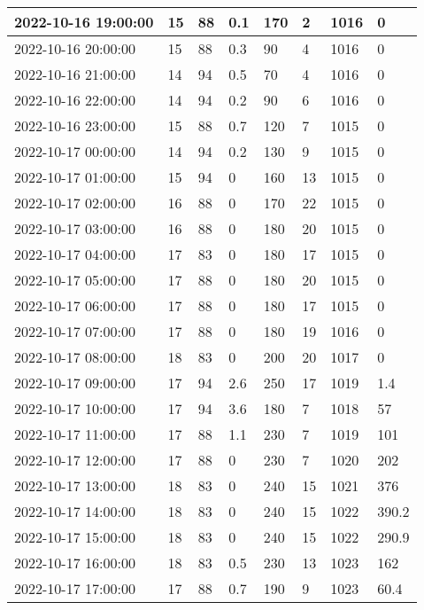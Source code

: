 \begin{longtable}{|l|l|l|l|l|l|l|l|}
        2022-10-16 19:00:00 & 15 & 88 & 0.1 & 170 & 2 & 1016 & 0 \\ \hline
        2022-10-16 20:00:00 & 15 & 88 & 0.3 & 90 & 4 & 1016 & 0 \\ \hline
        2022-10-16 21:00:00 & 14 & 94 & 0.5 & 70 & 4 & 1016 & 0 \\ \hline
        2022-10-16 22:00:00 & 14 & 94 & 0.2 & 90 & 6 & 1016 & 0 \\ \hline
        2022-10-16 23:00:00 & 15 & 88 & 0.7 & 120 & 7 & 1015 & 0 \\ \hline
        2022-10-17 00:00:00 & 14 & 94 & 0.2 & 130 & 9 & 1015 & 0 \\ \hline
        2022-10-17 01:00:00 & 15 & 94 & 0 & 160 & 13 & 1015 & 0 \\ \hline
        2022-10-17 02:00:00 & 16 & 88 & 0 & 170 & 22 & 1015 & 0 \\ \hline
        2022-10-17 03:00:00 & 16 & 88 & 0 & 180 & 20 & 1015 & 0 \\ \hline
        2022-10-17 04:00:00 & 17 & 83 & 0 & 180 & 17 & 1015 & 0 \\ \hline
        2022-10-17 05:00:00 & 17 & 88 & 0 & 180 & 20 & 1015 & 0 \\ \hline
        2022-10-17 06:00:00 & 17 & 88 & 0 & 180 & 17 & 1015 & 0 \\ \hline
        2022-10-17 07:00:00 & 17 & 88 & 0 & 180 & 19 & 1016 & 0 \\ \hline
        2022-10-17 08:00:00 & 18 & 83 & 0 & 200 & 20 & 1017 & 0 \\ \hline
        2022-10-17 09:00:00 & 17 & 94 & 2.6 & 250 & 17 & 1019 & 1.4 \\ \hline
        2022-10-17 10:00:00 & 17 & 94 & 3.6 & 180 & 7 & 1018 & 57 \\ \hline
        2022-10-17 11:00:00 & 17 & 88 & 1.1 & 230 & 7 & 1019 & 101 \\ \hline
        2022-10-17 12:00:00 & 17 & 88 & 0 & 230 & 7 & 1020 & 202 \\ \hline
        2022-10-17 13:00:00 & 18 & 83 & 0 & 240 & 15 & 1021 & 376 \\ \hline
        2022-10-17 14:00:00 & 18 & 83 & 0 & 240 & 15 & 1022 & 390.2 \\ \hline
        2022-10-17 15:00:00 & 18 & 83 & 0 & 240 & 15 & 1022 & 290.9 \\ \hline
        2022-10-17 16:00:00 & 18 & 83 & 0.5 & 230 & 13 & 1023 & 162 \\ \hline
        2022-10-17 17:00:00 & 17 & 88 & 0.7 & 190 & 9 & 1023 & 60.4 \\ \hline

\end{longtable}
